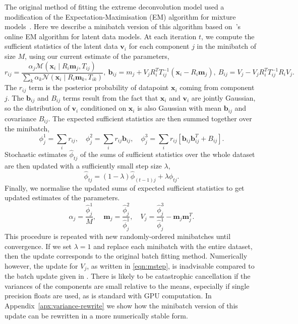 \documentclass{article}
\newcommand{\bx}{\mathbf{x}}
\newcommand{\bv}{\mathbf{v}}
\newcommand{\bm}{\mathbf{m}}
\newcommand{\bb}{\mathbf{b}}
\begin{document}
The original method of fitting the extreme deconvolution model used a modification of the Expectation-Maximisation (EM) algorithm for mixture models~\cite{dempsterMaximumLikelihoodIncomplete1977}.
Here we describe a minibatch version of this algorithm based on~\citet{cappeOnlineExpectationMaximization2009}'s online EM algorithm for latent data models.
At each iteration $t$, we compute the sufficient statistics of the latent data $\bv_i$ for each component $j$ in the minibatch of size $M$, using our current estimate of the parameters,
\begin{equation}
r_{ij} = \frac{\alpha_j \mathcal{M}(\bx_i \mid R_i\bm_j, T_{ij})}{\sum_k \alpha_k \mathcal{N}(\bx_i \mid R_i\bm_k, T_{ik})}, \ 
\bb_{ij} = m_j + V_j R_i^T T_{ij}^{-1}(\bx_i - R_i \bm_j), \ 
B_{ij} = V_j - V_j R_i^T T_{ij}^{-1}R_iV_j.
\end{equation}
The $r_{ij}$ term is the posterior probability of datapoint $\bx_i$ coming from component $j$.
The $\bb_{ij}$ and $B_{ij}$ terms result from the fact that $\bx_i$ and $\bv_i$ are jointly Gaussian, so the distribution of $\bv_i$ conditioned on $\bx_i$ is also Gaussian with mean $\bb_{ij}$ and covariance $B_{ij}$.
The expected sufficient statistics are then summed together over the minibatch,
\begin{equation}
\phi_j^1 = \sum_i r_{ij}, \quad
\phi_j^2 = \sum_i r_{ij} \bb_{ij}, \quad
\phi_j^3 = \sum_i r_{ij} [\bb_{ij}\bb_{ij}^T + B_{ij}].
\end{equation}
Stochastic estimates $\hat{\phi}_{tj} $ of the sums of sufficient statistics over the whole dataset are then updated with a sufficiently small step size $\lambda$,
\begin{equation}
\hat{\phi}_{tj} = (1 - \lambda)\hat{\phi}_{(t-1)j} + \lambda \phi_{tj}.
\end{equation}
Finally, we normalise the updated sums of expected sufficient statistics to get updated estimates of the parameters.
\begin{equation}
\alpha_j = \frac{\hat{\phi}_j^1}{M}, \quad
\bm_j = \frac{\hat{\phi}_j^2}{\hat{\phi}_j^1}, \quad
V_j = \frac{\hat{\phi}_j^3}{\hat{\phi}_j^1} - \bm_j \bm_j^T.
\label{eqn:mstep}
\end{equation}
This procedure is repeated with new randomly-ordered minibatches until convergence.
If we set $\lambda=1$ and replace each minibatch with the entire dataset,
then the update corresponds to the original batch fitting method.
Numerically however, the update for $V_j$, as written in \eqref{eqn:mstep}, is inadvisable compared to the batch update given in \cite{bovyExtremeDeconvolutionInferring2011}. There is likely to be catastrophic cancellation if the variances of the components are small relative to the means, especially if single precision floats are used, as is standard with GPU computation.
In Appendix~\ref{apx:variance-rewrite} we show how the minibatch version of this update can be rewritten in a
more numerically stable form.
\end{document}

